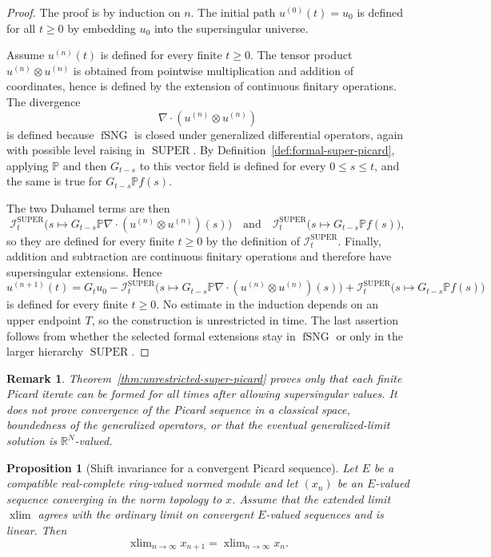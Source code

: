 \documentclass{amsart}
\newtheorem{prop}{Proposition}
\newtheorem{rem}{Remark}
\DeclareMathOperator{\xlim}{xlim}
\DeclareMathOperator{\SUPER}{SUPER}
\DeclareMathOperator{\fSNG}{fSNG}
\begin{document}
\begin{proof}
The proof is by induction on $n$.  The initial path
$u^{(0)}(t)=u_0$ is defined for all $t\geq0$ by embedding $u_0$ into the
supersingular universe.

Assume $u^{(n)}(t)$ is defined for every finite $t\geq0$.  The tensor product
$u^{(n)}\otimes u^{(n)}$ is obtained from pointwise multiplication and
addition of coordinates, hence is defined by the extension of continuous
finitary operations.  The divergence
\[
  \nabla\cdot(u^{(n)}\otimes u^{(n)})
\]
is defined because $\fSNG$ is closed under generalized differential
operators, again with possible level raising in $\SUPER$.  By
Definition~\ref{def:formal-super-picard}, applying $\mathbb{P}$ and then
$G_{t-s}$ to this vector field is defined for every $0\leq s\leq t$, and the
same is true for $G_{t-s}\mathbb{P}f(s)$.

The two Duhamel terms are then
\[
  \mathcal I_t^{\SUPER}
  \bigl(s\mapsto
  G_{t-s}\mathbb{P}\nabla\cdot(u^{(n)}\otimes u^{(n)})(s)\bigr)
  \quad\text{and}\quad
  \mathcal I_t^{\SUPER}
  \bigl(s\mapsto G_{t-s}\mathbb{P}f(s)\bigr),
\]
so they are defined for every finite $t\geq0$ by the definition of
$\mathcal I_t^{\SUPER}$.  Finally, addition and subtraction are continuous
finitary operations and therefore have supersingular extensions.  Hence
\[
  u^{(n+1)}(t)
  =
  G_tu_0
  -\mathcal I_t^{\SUPER}
  \bigl(s\mapsto
  G_{t-s}\mathbb{P}\nabla\cdot(u^{(n)}\otimes u^{(n)})(s)\bigr)
  +\mathcal I_t^{\SUPER}
  \bigl(s\mapsto G_{t-s}\mathbb{P}f(s)\bigr)
\]
is defined for every finite $t\geq0$.  No estimate in the induction depends on
an upper endpoint $T$, so the construction is unrestricted in time.  The
last assertion follows from whether the selected formal extensions stay in
$\fSNG$ or only in the larger hierarchy $\SUPER$.
\end{proof}

\begin{rem}
Theorem~\ref{thm:unrestricted-super-picard} proves only that each finite
Picard iterate can be formed for all times after allowing supersingular
values.  It does not prove convergence of the Picard sequence in a classical
space, boundedness of the generalized operators, or that the eventual
generalized-limit solution is $\mathbb{R}^N$-valued.
\end{rem}

\begin{prop}[Shift invariance for a convergent Picard sequence]\label{prop:picard-shift}
Let $E$ be a compatible real-complete ring-valued normed module and let
$(x_n)$ be an $E$-valued sequence converging in the norm topology to $x$.
Assume that the extended limit $\xlim$ agrees with the ordinary limit on
convergent $E$-valued sequences and is linear.  Then
\[
  \xlim_{n\to\infty}x_{n+1}=\xlim_{n\to\infty}x_n .
\]
\end{prop}
\end{document}
